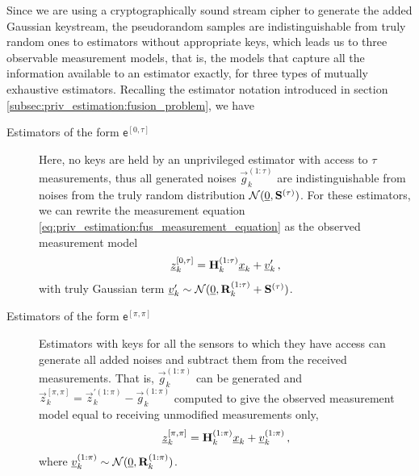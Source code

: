 Since we are using a cryptographically sound stream cipher to generate the added Gaussian keystream, the pseudorandom samples are indistinguishable from truly random ones to estimators without appropriate keys, which leads us to three observable measurement models, that is, the models that capture all the information available to an estimator exactly, for three types of mutually exhaustive estimators. Recalling the estimator notation introduced in section \ref{subsec:priv_estimation:fusion_problem}, we have
\begin{description}
    \item[Estimators of the form $\mathsf{e}^{[0,\tau]}$] Here, no keys are held by an unprivileged estimator with access to $\tau$ measurements, thus all generated noises $\vec{g}_k^{(1:\tau)}$ are indistinguishable from noises from the truly random distribution $\mathcal{N}({\underline{0}}, {{\mathbf{S}}}^{(\tau)})$. For these estimators, we can rewrite the measurement equation \eqref{eq:priv_estimation:fus_measurement_equation} as the observed measurement model
    \begin{equation}\label{eq:priv_estimation:fus_0q_obs_measurement_model}
        {\underline{z}}_k^{[0,\tau]} = {{\mathbf{H}}}_k^{(1:\tau)}{\underline{x}}_k + {\underline{v}}_k^{\prime}\,,
    \end{equation}
    with truly Gaussian term ${\underline{v}}_k^{\prime} \sim \mathcal{N}({\underline{0}}, {{\mathbf{R}}}_k^{(1:\tau)}+{{\mathbf{S}}}^{(\tau)})$.
  
    \item[Estimators of the form $\mathsf{e}^{[\pi,\pi]}$] Estimators with keys for all the sensors to which they have access can generate all added noises and subtract them from the received measurements. That is, $\vec{g}_k^{(1:\pi)}$ can be generated and $\vec{z}_k^{[\pi,\pi]}=\vec{z}_k^{\prime(1:\pi)}-\vec{g}_k^{(1:\pi)}$ computed to give the observed measurement model equal to receiving unmodified measurements only,
    \begin{equation}\label{eq:priv_estimation:fus_pp_obs_measurement_model}
        {\underline{z}}_k^{[\pi,\pi]} = {{\mathbf{H}}}_k^{(1:\pi)}{\underline{x}}_k + {\underline{v}}_k^{(1:\pi)}\,,
    \end{equation}
    where ${\underline{v}}_k^{(1:\pi)} \sim \mathcal{N}({\underline{0}}, {{\mathbf{R}}}_k^{(1:\pi)})$.


\end{description}
